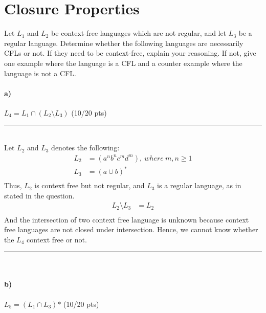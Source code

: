\documentclass[a4paper,12pt]{article}
\newcommand{\HRule}{\rule{\linewidth}{1mm}}
\begin{document}
\newpage
\section{Closure Properties \hfill {}}

Let $L_1$ and $L_2$ be context-free languages which are not regular, and let $L_3$ be a regular language. Determine whether the following languages are necessarily CFLs or not. If they need to be context-free, explain your reasoning. If not, give one example where the language is a CFL and a counter example where the language is not a CFL. \\

\paragraph{a)} $L_4 = L_1 \cap (L_2 \setminus L_3)$ \hfill \small{(10/20 pts)} \\

\HRule\\
Let $L_2$ and $L_3$ denotes the following:\\
\begin{align*}
L_2&= (a^n b^n c^m d^m),\ where\ m,n \geq 1 \\
L_3&= (a \cup b)^* \\
\end{align*}
Thus, $L_2$ is context free but not regular, and $L_3$ is a regular language, as in stated in the question.
\begin{align*}
L_2 \setminus L_3&= L_2 \\
\end{align*}
And the intersection of two context free language is unknown because context free languages are not closed under intersection. Hence, we cannot know whether the $L_4$ context free or not.\\
\HRule\\

\paragraph{b)} $L_5 = (L_1 \cap L_3)\text{*}$ \hfill \small{(10/20 pts)} \\
\end{document}
